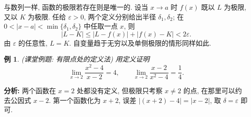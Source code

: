 \documentclass[UTF8,openany]{ctexbook}
\theoremstyle{chinesetextbook}
\newtheorem{example}{例}[section]
\begin{document}
与数列一样, 函数的极限若存在则是唯一的. 设当 $x\to a$ 时 $f(x)$ 既以 $L$ 为极限, 又以 $K$ 为极限. 任给 $\varepsilon>0$, 两个定义分别给出半径 $\delta_1,\delta_2$; 在 $0<|x-a|<\min\{\delta_1,\delta_2\}$ 中任取一点 $x$, 则
\[
|L-K|\le|L-f(x)|+|f(x)-K|<2\varepsilon.
\]
由 $\varepsilon$ 的任意性, $L=K$. 自变量趋于无穷以及单侧极限的情形同样如此.


\begin{example}
\textnormal{(课堂例题: 有限点处的定义法)} 用定义证明
\[
\lim_{x\to2}\frac{x^2-4}{x-2}=4,\qquad\lim_{x\to2}\frac{x-2}{x^2-4}=\frac14.
\]
\end{example}
\par\indent\textbf{分析:} 两个函数在 $x=2$ 处都没有定义, 但极限只考察 $x\ne2$ 的点, 在那里可以约去公因式 $x-2$. 第一个函数化为 $x+2$, 误差 $|(x+2)-4|=|x-2|$, 取 $\delta=\varepsilon$ 即可.
\end{document}
